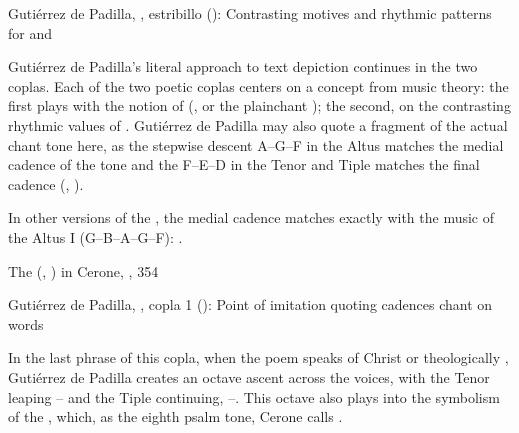 {Gutiérrez de Padilla, , estribillo
(): Contrasting motives and rhythmic patterns for  and }

Gutiérrez de Padilla's literal approach to text depiction continues in the two
coplas.
Each of the two poetic coplas centers on a concept from music theory: the first
plays with the notion of  (, or
the plainchant ); the second, on the contrasting
rhythmic values of .
Gutiérrez de Padilla may also quote a fragment of the actual chant tone here,
as the stepwise descent A--G--F in the Altus matches the medial cadence of the
tone and the F--E--D in the Tenor and Tiple matches the final cadence
(, 
).%
\begin{Footnote}
    In other versions of the , the medial cadence matches
    exactly with the music of the Altus I (G--B\fl{}--A--G--F):
    \autocite[160]{Catholic:LiberUsualis1956}.
\end{Footnote}


{The  (, ) in Cerone, , 354}

{Gutiérrez de Padilla, , copla 1
(): Point of imitation quoting cadences chant  on words }

In the last phrase of this copla, when the poem speaks of Christ  or theologically , Gutiérrez
de Padilla creates an octave ascent across the voices, with the Tenor leaping
-- and the Tiple continuing, --.
This octave also plays into the symbolism of the ,
which, as the eighth psalm tone, Cerone calls .%
    \Autocite[354]{Cerone:Melopeo}

